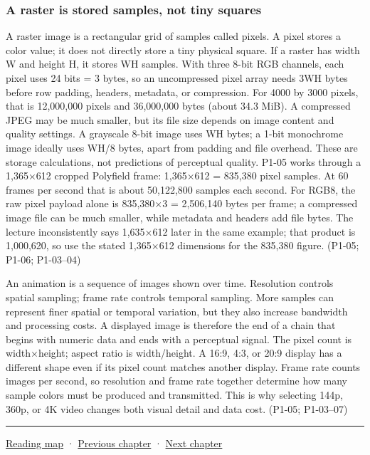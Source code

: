 \subsubsection{A raster is stored samples, not tiny squares}\label{03-visual-computing-i-ch003-a-raster-is-stored-samples-not-tiny-squares}

A raster image is a rectangular grid of samples called pixels. A pixel stores a color value; it does not directly store a tiny physical square. If a raster has width W and height H, it stores WH samples. With three 8-bit RGB channels, each pixel uses 24 bits = 3 bytes, so an uncompressed pixel array needs 3WH bytes before row padding, headers, metadata, or compression. For 4000 by 3000 pixels, that is 12,000,000 pixels and 36,000,000 bytes (about 34.3 MiB). A compressed JPEG may be much smaller, but its file size depends on image content and quality settings. A grayscale 8-bit image uses WH bytes; a 1-bit monochrome image ideally uses WH/8 bytes, apart from padding and file overhead. These are storage calculations, not predictions of perceptual quality. P1-05 works through a 1,365×612 cropped Polyfield frame: 1,365×612 = 835,380 pixel samples. At 60 frames per second that is about 50,122,800 samples each second. For RGB8, the raw pixel payload alone is 835,380×3 = 2,506,140 bytes per frame; a compressed image file can be much smaller, while metadata and headers add file bytes. The lecture inconsistently says 1,635×612 later in the same example; that product is 1,000,620, so use the stated 1,365×612 dimensions for the 835,380 figure. (P1-05; P1-06; P1-03--04)

An animation is a sequence of images shown over time. Resolution controls spatial sampling; frame rate controls temporal sampling. More samples can represent finer spatial or temporal variation, but they also increase bandwidth and processing costs. A displayed image is therefore the end of a chain that begins with numeric data and ends with a perceptual signal. The pixel count is width×height; aspect ratio is width/height. A 16:9, 4:3, or 20:9 display has a different shape even if its pixel count matches another display. Frame rate counts images per second, so resolution and frame rate together determine how many sample colors must be produced and transmitted. This is why selecting 144p, 360p, or 4K video changes both visual detail and data cost. (P1-05; P1-03--07)

\begin{center}\rule{0.5\linewidth}{0.5pt}\end{center}

\hyperref[volume-reading-map]{Reading map} · \hyperref[03-visual-computing-i-ch002-surfaces-topology-and-parameterization]{Previous chapter} · \hyperref[03-visual-computing-i-ch004-sampling-filtering-and-reconstruction]{Next chapter}
